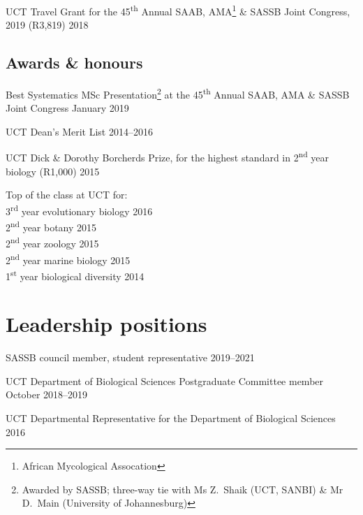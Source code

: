 \documentclass[10pt]{article}
\begin{document}
UCT Travel Grant for the 45\textsuperscript{th} Annual SAAB,
  AMA\footnote{African Mycological Assocation} \& SASSB Joint
  Congress, 2019 (R3,819)                                            \hfill 2018

\subsection*{Awards \& honours}

Best Systematics MSc Presentation\footnote{Awarded by SASSB;
  three-way tie with Ms Z.~Shaik (UCT, SANBI) \& Mr D.~Main
  (University of Johannesburg)} at the 45\textsuperscript{th}
  Annual SAAB, AMA \& SASSB Joint Congress                   \hfill January 2019

UCT Dean's Merit List                                          \hfill 2014--2016

UCT Dick \& Dorothy Borcherds Prize, for the highest standard in 
  2\textsuperscript{nd} year biology (R1,000)                        \hfill 2015

Top of the class at UCT for: \\
\hspace{2em} 3\textsuperscript{rd} year evolutionary biology      \hfill 2016 \\
\hspace{2em} 2\textsuperscript{nd} year botany                    \hfill 2015 \\
\hspace{2em} 2\textsuperscript{nd} year zoology                   \hfill 2015 \\
\hspace{2em} 2\textsuperscript{nd} year marine biology            \hfill 2015 \\
\hspace{2em} 1\textsuperscript{st} year biological diversity      \hfill 2014

\section*{Leadership positions} %

SASSB council member, student representative                   \hfill 2019--2021

UCT Department of Biological Sciences Postgraduate Committee member
                                                       \hfill October 2018--2019

UCT Departmental Representative for the Department of Biological Sciences
                                                                     \hfill 2016
\end{document}
